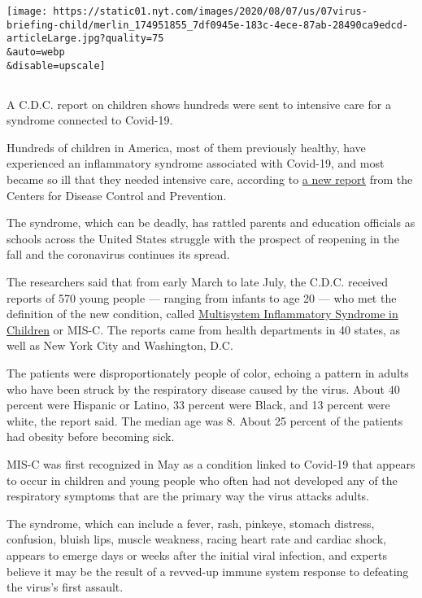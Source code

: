 \texttt{[image: https://static01.nyt.com/images/2020/08/07/us/07virus-briefing-child/merlin\_174951855\_7df0945e-183c-4ece-87ab-28490ca9edcd-articleLarge.jpg?quality=75\\\&auto=webp\\\&disable=upscale]}

\hypertarget{section}{%
\subsection{}\label{section}}

A C.D.C. report on children shows hundreds were sent to intensive care
for a syndrome connected to Covid-19.

Hundreds of children in America, most of them previously healthy, have
experienced an inflammatory syndrome associated with Covid-19, and most
became so ill that they needed intensive care, according to
\href{https://www.cdc.gov/mmwr/volumes/69/wr/mm6932e2.htm?s_cid=mm6932e2_w\#T1_down}{a
new report} from the Centers for Disease Control and Prevention.

The syndrome, which can be deadly, has rattled parents and education
officials as schools across the United States struggle with the prospect
of reopening in the fall and the coronavirus continues its spread.

The researchers said that from early March to late July, the C.D.C.
received reports of 570 young people --- ranging from infants to age 20
--- who met the definition of the new condition, called
\href{https://www.nytimes.com/2020/05/17/health/coronavirus-multisystem-fnflammatory-syndrome-children-teenagers.html}{Multisystem
Inflammatory Syndrome in Children} or MIS-C. The reports came from
health departments in 40 states, as well as New York City and
Washington, D.C.

The patients were disproportionately people of color, echoing a pattern
in adults who have been struck by the respiratory disease caused by the
virus. About 40 percent were Hispanic or Latino, 33 percent were Black,
and 13 percent were white, the report said. The median age was 8. About
25 percent of the patients had obesity before becoming sick.

MIS-C was first recognized in May as a condition linked to Covid-19 that
appears to occur in children and young people who often had not
developed any of the respiratory symptoms that are the primary way the
virus attacks adults.

The syndrome, which can include a fever, rash, pinkeye, stomach
distress, confusion, bluish lips, muscle weakness, racing heart rate and
cardiac shock, appears to emerge days or weeks after the initial viral
infection, and experts believe it may be the result of a revved-up
immune system response to defeating the virus's first assault.


